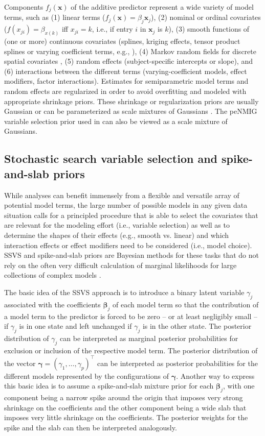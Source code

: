 \documentclass[article, shortnames, nojss, noheadings, notitle]{jss}
\begin{document}
Components $f_j(\bm x)$ of the additive predictor represent a wide variety of model terms, such as
(1) linear terms ($f_j(\bm x) = \beta_j \bm x_j$),
(2) nominal or ordinal covariates ($f(x_{ji}) = \beta_{x(k)}$ iff $x_{ji} = k$, i.e., if entry $i$ in $\bm x_j$ is $k$),
(3) smooth functions of (one or more) continuous covariates (splines, kriging effects, tensor product splines or varying coefficient terms, e.g., \citet{Wood:2006}),
(4) Markov random fields for discrete spatial covariates \citep[e.g.][]{Rue:Held:2005},
(5) random effects (subject-specific intercepts or slope), and (6) interactions between the different terms (varying-coefficient models, effect modifiers, factor interactions).
Estimates for semiparametric model terms and random effects are regularized in order to
avoid overfitting and modeled with appropriate shrinkage priors.
These shrinkage or regularization priors are usually Gaussian or can
be parameterized as scale mixtures of Gaussians \citep[e.g.][]{Fahr:Kneib:Konrath:2010}.
The peNMIG variable selection prior used in  can also be viewed as a scale mixture of Gaussians.

\newpage
\subsection{Stochastic search variable selection and spike-and-slab priors}\label{spikeSlabSSVS}
While analyses can benefit immensely from a flexible and versatile array of potential model terms,
the large number of possible models in any given data situation calls for a principled procedure
that is able to select the covariates that
are relevant for the modeling effort (i.e., variable selection) as well as to determine
the shapes of their effects (e.g., smooth vs. linear) and which interaction effects or effect modifiers
need to be considered (i.e., model choice). SSVS and spike-and-slab priors are Bayesian methods
for these tasks that do not rely on the often very difficult calculation of marginal likelihoods for
large collections of complex models \citep[e.g.][]{Han:Carlin:2001}.

The basic idea of the SSVS approach \citep{George:McCulloch:1993} is to introduce a binary latent variable
$\gamma_j$ associated with the coefficients $\bm{\beta}_j$ of each model term so that the contribution of a model
term to the predictor is forced to be zero -- or at least negligibly small -- if $\gamma_j$ is in one state and
left unchanged if $\gamma_j$ is in the other state.
The posterior distribution of $\gamma_j$ can be interpreted as marginal
posterior probabilities for exclusion or inclusion of the respective model term. The posterior distribution
of the vector $\bm\gamma = (\gamma_1,\ldots,\gamma_p)^\top$ can be interpreted as posterior probabilities for the different
models represented by the configurations of $\bm\gamma$. Another way to express this basic idea is to assume
a spike-and-slab mixture prior for each $\bm{\beta}_j$, with one component being a narrow spike around the origin that
imposes very strong shrinkage on the coefficients and the other component being a wide slab that imposes
very little shrinkage on the coefficients. The posterior weights for the spike and the slab can then be interpreted
analogously.
\end{document}
